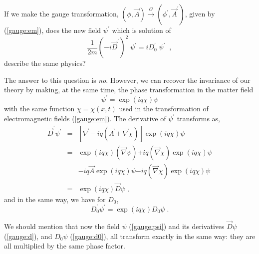 \documentclass[12pt]{report}
\begin{document}
If we make the gauge transformation, $(\phi, \vec{A})
\stackrel{G}{\longrightarrow} (\phi^\prime, \vec{A}^\prime)$, given
by (\ref{gauge:em}), does the new field $\psi^\prime$ which is
solution of
\[
\frac{1}{2m} (-i \vec{D}^\prime)^2 \; \psi^\prime = i D_0^\prime \;
\psi^\prime  \;\; ,
\]
describe the same physics?

The answer to this question is {\it no}. However, we can recover the
invariance of our theory by making, at the same time, the phase 
transformation in the matter field
\begin{equation}
 \psi^\prime  = \exp\left(i q \chi \right) \psi 
\label{gauge:psi}
\end {equation}
with the same function $\chi = \chi (x,t)$ used in the transformation
of electromagnetic fields (\ref{gauge:em}). The derivative of
$\psi^\prime$ transforms as,
\begin{eqnarray}
 \vec{D}^\prime \psi^\prime &=& 
\left[\vec{\nabla} - i q ( \vec{A}  + \vec{\nabla}
\chi ) \right] \exp\left(i q \chi\right)  \psi 
\nonumber \\
&=& \exp\left(i q \chi\right) ( \vec{\nabla} \psi )
{ + i q (\vec{\nabla} \chi ) \exp\left(i q \chi\right)\psi }
\nonumber\\
&&- i q  \vec{A} \exp\left(i q \chi\right) \psi  
{ - i q (\vec{\nabla} \chi ) \exp\left(i q \chi\right) \psi }
\nonumber \\
&=&   \exp\left(i q \chi\right) \vec{D} \psi \; ,
\label{gauge:d}
\end{eqnarray}
and in the same way, we have for $D_0$,
\begin{equation}
 D_0^\prime \psi^\prime = 
\exp\left(i q \chi\right) D_0 \psi  \; .
\label{gauge:d0}
\end{equation}

We should mention that now the field $\psi$ (\ref{gauge:psi}) and its
derivatives $\vec{D}\psi$ (\ref{gauge:d}), and $D_0 \psi$
(\ref{gauge:d0}), all transform exactly in the same way: they
are all multiplied by the same phase factor.
\end{document}
